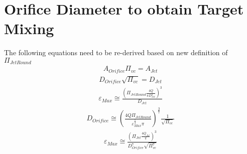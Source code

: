 \documentclass[letterpaper,10pt,english]{sphinxmanual}
\begin{document}
\section{Orifice Diameter to obtain Target Mixing}
\label{\detokenize{Rapid_Mix/RM_Design:orifice-diameter-to-obtain-target-mixing}}
The following equations need to be re-derived based on new definition of \(\Pi_{JetRound}\)
\begin{equation}\label{equation:Rapid_Mix/RM_Design:Rapid_Mix/RM_Design:0}
\begin{split}A_{Orifice} \Pi_{vc} = A_{Jet}\end{split}
\end{equation}\begin{equation}\label{equation:Rapid_Mix/RM_Design:Rapid_Mix/RM_Design:1}
\begin{split}D_{Orifice} \sqrt{\Pi_{vc}} = D_{Jet}\end{split}
\end{equation}\begin{equation}\label{equation:Rapid_Mix/RM_Design:Rapid_Mix/RM_Design:2}
\begin{split}\varepsilon_{Max} \cong \frac{ \left( \Pi_{JetRound} \frac{4Q}{\pi D_{Jet}^2} \right)^3}{D_{Jet}}\end{split}
\end{equation}\begin{equation}\label{equation:Rapid_Mix/RM_Design:Rapid_Mix/RM_Design:3}
\begin{split}D_{Orifice} \cong \left( \frac{4 Q \Pi_{JetRound}}{\varepsilon_{Max}^{\frac{1}{3}} \pi} \right)^{\frac{3}{7}} \frac{1}{\sqrt{\Pi_{vc} }}\end{split}
\end{equation}
\begin{equation}\label{equation:Rapid_Mix/RM_Design:Rapid_Mix/RM_Design:4}
\begin{split}\varepsilon_{Max} \cong  \frac{ \left( \Pi_{Jet} \frac{4 Q_{Jet}}{\pi} \right)^3 }{D_{Orifice}^7 \sqrt{\Pi_{vc}^7} }\end{split}
\end{equation}
\end{document}
